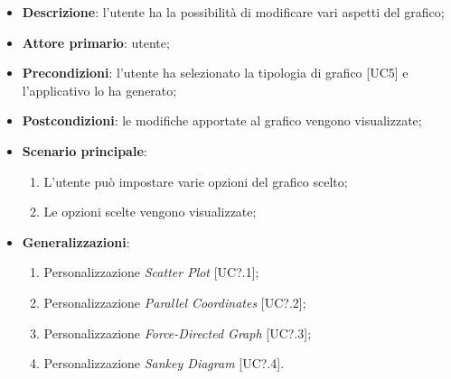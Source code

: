 \begin{itemize}
  \item \textbf{Descrizione}: l'utente ha la possibilità di modificare vari aspetti del grafico;
  \item \textbf{Attore primario}: utente;
  \item \textbf{Precondizioni}: l'utente ha selezionato la tipologia di grafico [UC5] e l'applicativo lo ha generato;
  \item \textbf{Postcondizioni}: le modifiche apportate al grafico vengono visualizzate;
  \item \textbf{Scenario principale}:
   \begin{enumerate}
    \item L'utente può impostare varie opzioni del grafico scelto;
    \item Le opzioni scelte vengono visualizzate;
  \end{enumerate}
  \item \textbf{Generalizzazioni}:
    \begin{enumerate}
      \item Personalizzazione \textit{Scatter Plot} [UC?.1];
      \item Personalizzazione \textit{Parallel Coordinates} [UC?.2];
      \item Personalizzazione \textit{Force-Directed Graph} [UC?.3];
      \item Personalizzazione \textit{Sankey Diagram} [UC?.4].
    \end{enumerate}
\end{itemize}

